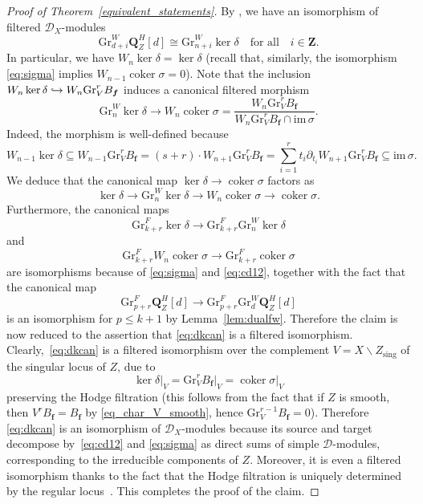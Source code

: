 \documentclass[11pt]{article}
\numberwithin{equation}{section}
\newcommand\hto{\mathrel{\lhook\joinrel\to}}
\newcommand{\DXmodules}{$\cD_X$\nobreakdash-mod\-ules\xspace}
\theoremstyle{plain}
\theoremstyle{definition}
\newcommand\Z{{\mathbf Z}}
\newcommand\Q{{\mathbf Q}}
\newcommand\cD{\mathcal{D}}
\newcommand\bff{{\boldsymbol f}}
\newcommand\gr{\mathrm{Gr}}
\newcommand\sing{\mathrm{sing}}
\DeclareMathOperator{\coker}{coker}
\begin{document}
\begin{proof}[Proof of Theorem~\ref{equivalent_statements}]
By \cite[Th.\,1.2]{CD}, we have an isomorphism of filtered \DXmodules
\begin{equation}\label{eq:cd12}
\gr^W_{d+i}\Q_Z^H[d] \cong \gr^W_{n+i}\ker\delta \quad\text{for all}\quad i\in\Z.
\end{equation}
In particular, we have $W_n\ker\delta=\ker\delta$ (recall that, similarly, the isomorphism \eqref{eq:sigma}
implies $W_{n-1}\coker\sigma=0$).
Note that the inclusion $W_n\ker\delta \hto W_n\gr^r_V B_\bff$ induces a canonical filtered morphism
\begin{equation}\label{eq:dkcan}
\gr^W_n\ker\delta \to W_n\coker\sigma=\frac{W_n\gr^r_V B_\bff}{W_n\gr^r_V B_\bff\cap \mathrm{im\,}\sigma}.
\end{equation}
Indeed, the morphism is well-defined because
\[
W_{n-1}\ker\delta \subseteq W_{n-1}\gr^r_VB_\bff=(s+r)\cdot W_{n+1}\gr^r_VB_\bff=\sum^r_{i=1} t_i\partial_{t_i}W_{n+1}\gr^r_VB_\bff \subseteq \mathrm{im\,}\sigma.
\]
We deduce that the canonical map $\ker \delta \to \coker \sigma$ factors as
\[
\ker\delta \to \gr^W_n\ker\delta \to W_n\coker\sigma \to \coker\sigma.
\]
Furthermore, the canonical maps
\[\gr^F_{k+r}\ker\delta \to \gr^F_{k+r}\gr^W_n\ker\delta\] and
\[\gr^F_{k+r}W_n\coker\sigma \to \gr^F_{k+r}\coker\sigma\] are isomorphisms because of \eqref{eq:sigma} and \eqref{eq:cd12}, together with the fact that
the canonical map
\[
\gr^F_{p+r}\Q_Z^H[d] \to\gr^F_{p+r}\gr^W_d\Q_Z^H[d]
\]
is an isomorphism for $p\leq k+1$ by Lemma~\ref{lem:dualfw}. Therefore the claim is now reduced to the
assertion that \eqref{eq:dkcan} is a filtered isomorphism. Clearly,~\eqref{eq:dkcan} is a filtered isomorphism over the complement
$V=X\smallsetminus Z_\sing$ of the singular locus of $Z$, due to
\[
\ker\delta\vert_V =\gr^r_V B_\bff\vert_V = \coker\sigma\vert_V
\]
preserving the Hodge filtration (this follows from the fact that if $Z$ is smooth, then $V^rB_{\bff}=B_{\bff}$ by \eqref{eq_char_V_smooth}, hence $\gr_V^{r-1}B_{\bff}=0$).
Therefore \eqref{eq:dkcan} is an isomorphism of \DXmodules because its source and target decompose by~\eqref{eq:cd12} and \eqref{eq:sigma}
as direct sums of simple $\cD$-modules, corresponding to the irreducible components of $Z$. Moreover, it is even a filtered isomorphism thanks to the fact that the Hodge filtration is uniquely determined by the regular locus~\cite[(3.2.2.2)]{Saito_MHP}. This completes the proof of the claim.


\end{proof}
\end{document}
